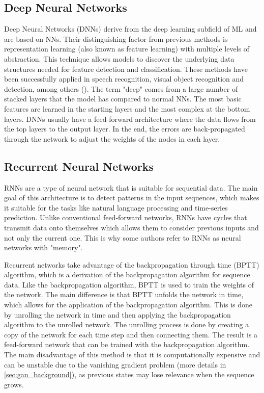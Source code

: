\subsection{Deep Neural Networks}\label{sec:deep_learning}
Deep Neural Networks (DNNs) derive from the  deep learning subfield of ML and are based on NNs. Their distinguishing factor from previous methods is representation learning (also known as feature learning) with multiple levels of abstraction. This technique allows models to discover the underlying data structures needed for feature detection and classification. These methods have been successfully applied in speech recognition, visual object recognition and detection, among others (\cite{lecun.etal_DeepLearning_2015}). The term "deep" comes from a large number of stacked layers that the model has compared to normal NNs. The most basic features are learned in the starting layers and the most complex at the bottom layers. DNNs usually have a feed-forward architecture where the data flows from the top layers to the output layer. In the end, the errors are back-propagated through the network to adjust the weights of the nodes in each layer.

\subsection{Recurrent Neural Networks}\label{sec:rnn}
RNNs are a type of neural network that is suitable for sequential data. The main goal of this architecture is to detect patterns in the input sequences, which makes it suitable for the tasks like natural language processing and time-series prediction. Unlike conventional feed-forward networks, RNNs have cycles that transmit data onto themselves which allows them to consider previous inputs and not only the current one. This is why some authors refer to RNNs as neural networks with "memory". 

Recurrent networks take advantage of the backpropagation through time (BPTT) algorithm, which is a derivation of the backpropagation algorithm for sequence data. Like the backpropagation algorithm, BPTT is used to train the weights of the network. The main difference is that BPTT unfolds the network in time, which allows for the application of the backpropagation algorithm. This is done by unrolling the network in time and then applying the backpropagation algorithm to the unrolled network. The unrolling process is done by creating a copy of the network for each time step and then connecting them. The result is a feed-forward network that can be trained with the backpropagation algorithm. The main disadvantage of this method is that it is computationally expensive and can be unstable due to the vanishing gradient problem (more details in \ref{sec:gan_background}), as previous states may lose relevance when the sequence grows.

